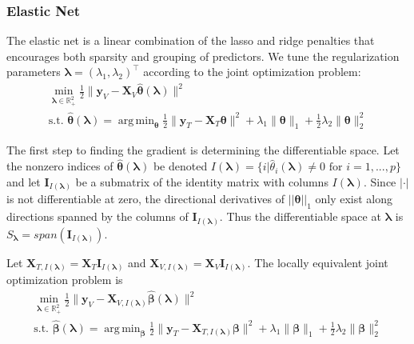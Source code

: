 \documentclass[12pt]{article}
\DeclareMathOperator*{\argmin}{arg\,min}
\begin{document}
\subsubsection{Elastic Net}\label{sec:enet}

The elastic net \citep{zou2003regression} is a linear combination of the lasso and ridge penalties that encourages both sparsity and grouping of predictors. We tune the regularization parameters $\boldsymbol{\lambda} = (\lambda_1, \lambda_2)^\top$ according to the joint optimization problem:
\begin{equation}
\begin{array}{c}
\min_{\boldsymbol{\lambda} \in \mathbb{R}^2_{+}} \frac{1}{2} \| \boldsymbol{y}_V - \boldsymbol{X}_V \hat{\boldsymbol{\theta}} (\boldsymbol \lambda) \| ^2 \\
\text{s.t. }
\hat{\boldsymbol{\theta}} (\boldsymbol{\lambda}) = \argmin_{\boldsymbol{\theta}} \frac{1}{2} \| \boldsymbol{y}_T - \boldsymbol{X}_T \boldsymbol{\theta} \| ^2
+ \lambda_1 \| \boldsymbol{\theta} \|_1
+ \frac{1}{2}\lambda_2 \| \boldsymbol{\theta} \|_2^2
\end{array}
\end{equation}

The first step to finding the gradient is determining the differentiable space. Let the nonzero indices of $\hat{\boldsymbol{\theta}}(\boldsymbol{\lambda})$ be denoted $I(\boldsymbol\lambda) = \{i | \hat{\theta}_i(\boldsymbol\lambda) \ne 0 \text{ for } i=1,...,p \}$ and let $\boldsymbol I_{I(\boldsymbol \lambda)}$ be a submatrix of the identity matrix with columns $I(\boldsymbol\lambda)$. Since $|\cdot|$ is not differentiable at zero, the directional derivatives of $||\boldsymbol \theta||_1$ only exist along directions spanned by the columns of $\boldsymbol I_{I(\boldsymbol \lambda)}$. Thus the differentiable space at $\boldsymbol \lambda$ is
$
S_{\boldsymbol{\lambda}} = span(\boldsymbol I_{I(\boldsymbol \lambda)})
\label{eq:en_diff_space}
$.


Let $\boldsymbol{X}_{T, I(\boldsymbol\lambda)} = \boldsymbol{X}_T \boldsymbol{I}_{I(\boldsymbol \lambda)}$ and $\boldsymbol{X}_{V, I(\boldsymbol\lambda)}  = \boldsymbol{X}_V \boldsymbol{I}_{I(\boldsymbol \lambda)}$.  The locally equivalent joint optimization problem is
\begin{equation}
\begin{array}{c}
\min_{\boldsymbol{\lambda} \in \mathbb{R}^2_{+}} \frac{1}{2} \| \boldsymbol{y}_V - \boldsymbol{X}_{V, I(\boldsymbol \lambda)} \hat{\boldsymbol{\beta}} (\boldsymbol \lambda) \| ^2 \\
\text{s.t. }
\hat{\boldsymbol{\beta}} (\boldsymbol{\lambda}) = \argmin_{\boldsymbol \beta} \frac{1}{2} \| \boldsymbol{y}_T - \boldsymbol{X}_{T, I(\boldsymbol \lambda)} \boldsymbol \beta \| ^2
+ \lambda_1 \| \boldsymbol \beta \|_1
+ \frac{1}{2}\lambda_2 \| \boldsymbol \beta \|_2^2
\end{array}
\end{equation}
\end{document}
